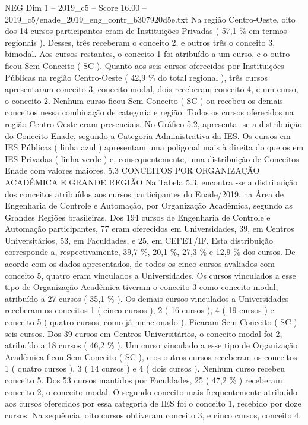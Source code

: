 \begin{textsample}{NEG Dim 1 – 2019\_c5 – Score 16.00 – 2019\_c5/enade\_2019\_eng\_contr\_b307920d5e.txt}
Na região Centro-Oeste, oito dos 14 cursos participantes eram de Instituições Privadas ( 57,1 \% em termos regionais ).
Desses, três receberam o conceito 2, e outros três o conceito 3, bimodal.
Aos cursos restantes, o conceito 1 foi atribuído a um curso, e o outro ficou Sem Conceito ( SC ).
Quanto aos seis cursos oferecidos por Instituições Públicas na região Centro-Oeste ( 42,9 \% do total regional ), três cursos apresentaram conceito 3, conceito modal, dois receberam conceito 4, e um curso, o conceito 2.
Nenhum curso ficou Sem Conceito ( SC ) ou recebeu os demais conceitos nessa combinação de categoria e região.
Todos os cursos oferecidos na região Centro-Oeste eram presenciais.
No Gráfico 5.2, apresenta -se a distribuição do Conceito Enade, segundo a Categoria Administrativa da IES.
Os cursos em IES Públicas ( linha azul ) apresentam uma poligonal mais à direita do que os em IES Privadas ( linha verde ) e, consequentemente, uma distribuição de Conceitos Enade com valores maiores. 5.3 CONCEITOS POR ORGANIZAÇÃO ACADÊMICA E GRANDE REGIÃO Na Tabela 5.3, encontra -se a distribuição dos conceitos atribuídos aos cursos participantes do Enade/2019, na Área de Engenharia de Controle e Automação, por Organização Acadêmica, segundo as Grandes Regiões brasileiras.
Dos 194 cursos de Engenharia de Controle e Automação participantes, 77 eram oferecidos em Universidades, 39, em Centros Universitários, 53, em Faculdades, e 25, em CEFET/IF.
Esta distribuição corresponde a, respectivamente, 39,7 \%, 20,1 \%, 27,3 \% e 12,9 \% dos cursos.
De acordo com os dados apresentados, de todos os cinco cursos avaliados com conceito 5, quatro eram vinculados a Universidades.
Os cursos vinculados a esse tipo de Organização Acadêmica tiveram o conceito 3 como conceito modal, atribuído a 27 cursos ( 35,1 \% ).
Os demais cursos vinculados a Universidades receberam os conceitos 1 ( cinco cursos ), 2 ( 16 cursos ), 4 ( 19 cursos ) e conceito 5 ( quatro cursos, como já mencionado ).
Ficaram Sem Conceito ( SC ) seis cursos.
Dos 39 cursos em Centros Universitários, o conceito modal foi 2, atribuído a 18 cursos ( 46,2 \% ).
Um curso vinculado a esse tipo de Organização Acadêmica ficou Sem Conceito ( SC ), e os outros cursos receberam os conceitos 1 ( quatro cursos ), 3 ( 14 cursos ) e 4 ( dois cursos ).
Nenhum curso recebeu conceito 5.
Dos 53 cursos mantidos por Faculdades, 25 ( 47,2 \% ) receberam conceito 2, o conceito modal.
O segundo conceito mais frequentemente atribuído aos cursos oferecidos por essa categoria de IES foi o conceito 1, recebido por doze cursos.
Na sequência, oito cursos obtiveram conceito 3, e cinco cursos, conceito 4.

\end{textsample}
